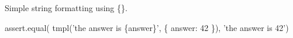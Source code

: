 Simple string formatting using {\ttfamily \{\}}.


\begin{DoxyCode}
assert.equal(
  tmpl('the answer is \{answer\}', \{ answer: 42 \}),
  'the answer is 42')
\end{DoxyCode}
 